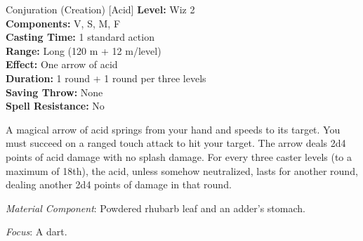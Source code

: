 {Conjuration (Creation) [Acid]}
{
	\textbf{Level:}
	Wiz 2\\
	\textbf{Components:}
	V, S, M, F\\
	\textbf{Casting Time:}
	1 standard action\\
	\textbf{Range:}
	Long (120 m + 12 m/level)\\
	\textbf{Effect:}
	One arrow of acid\\
	\textbf{Duration:}
	1 round + 1 round per three levels\\
	\textbf{Saving Throw:}
	None\\
	\textbf{Spell Resistance:}
	No\\
}
{
	A magical arrow of acid springs from your hand and speeds to its target. You must succeed on a ranged touch attack to hit your target. The arrow deals 2d4 points of acid damage with no splash damage. For every three caster levels (to a maximum of 18th), the acid, unless somehow neutralized, lasts for another round, dealing another 2d4 points of damage in that round.

	\textit{Material Component}:
	Powdered rhubarb leaf and an adder's stomach.

	\textit{Focus}:
	A dart.

}
